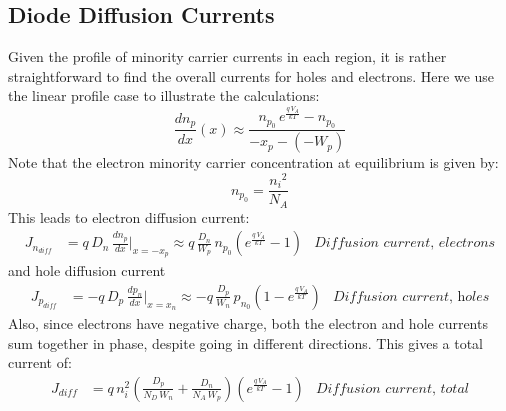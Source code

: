 \subsection{Diode Diffusion Currents}
Given the profile of minority carrier currents in each region, it is rather straightforward to find the overall currents for holes and electrons.  Here we use the linear profile case to illustrate the calculations:
    \begin{equation}
        \frac{dn_p}{dx}(x) \approx \frac{{n_{p_0}}\,e^{\frac{q\,V_A}{kT}} - n_{p_0}} {-{x_p} -(-{W_p})}
    \end{equation}
Note that the electron minority carrier concentration at equilibrium is given by:
    \begin{equation}
        n_{p_0} = \frac{{n_i}^2}{N_A}
    \end{equation}
This leads to electron diffusion current:
    \begin{align}
        J_{n_{diff}} &= q\,D_n\,\frac{dn_p}{dx} \bigg\rvert_{x = -x_p} \approx 
        q\,\frac{D_n}{W_p}\,{n_{p_0}} \left( e^{\frac{{q\,V_A}}{kT}} - 1 \right)
        & \textit{Diffusion current, electrons}
    \end{align}
and hole diffusion current
    \begin{align}
        J_{p_{diff}} &= -q\,D_p\,\frac{dp_n}{dx} \bigg\rvert_{x = x_n} \approx 
        -q\,\frac{D_p}{W_n}\,{p_{n_0}} \left( 1 - e^{\frac{{q\,V_A}}{kT}} \right)
        & \textit{Diffusion current, holes}
    \end{align}
Also, since electrons have negative charge, both the electron and hole currents sum together in phase, despite going in different directions.  This gives a total current of:
    \begin{align}
        J_{diff} &= q\,n_i^2 \left( \frac{D_p}{N_D\,W_n} + \frac{D_n}{N_A\,W_p} \right)
        \left( e^{\frac{q\,V_A}{kT}} - 1 \right)
        & \textit{Diffusion current, total}        
    \end{align}

